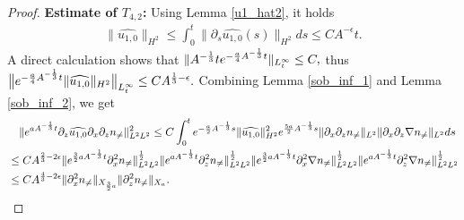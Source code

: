 \documentclass[12pt, reqno]{amsart}
\numberwithin{equation}{section}
\begin{document}
\begin{proof}
		\noindent\textbf{Estimate of $T_{4,2}$:}
		Using Lemma \ref{u1_hat2},  it holds
		\begin{equation*}
			\begin{aligned}
				\|\widehat{u_{1,0}}\|_{H^2}\leq \int_0^t \|\partial_s\widehat{u_{1,0}}(s)\|_{H^2}ds
				\leq CA^{-\epsilon}t.
			\end{aligned}
		\end{equation*}
		A direct calculation shows that $\|A^{-\frac13}t{\rm e}^{-\frac{a}{4}A^{-\frac13}t}\|_{L^{\infty}_t}\leq C,$
		thus
		$\big\|{\rm e}^{-\frac{a}{4}A^{-\frac13}t}\|\widehat{u_{1,0}}\|_{H^2}\big\|_{L^{\infty}_t} \leq CA^{\frac13-\epsilon}.$
		Combining Lemma \ref{sob_inf_1} and Lemma \ref{sob_inf_2}, we get
		\begin{equation}\label{temp1_2}
			\begin{aligned}
				&\quad\|{\rm e}^{aA^{-\frac{1}{3}}t}
				\partial_z\widehat{u_{1,0}}\partial_x\partial_z 	n_{\neq}\|_{L^2L^2}^2
				\leq C\int_0^t{\rm 	e}^{-\frac{a}{2}A^{-\frac13}s}\|\widehat{u_{1,0}}\|^2_{H^2}
				{\rm e}^{\frac{5a}{2}A^{-\frac13}s}
				\|\partial_x\partial_z n_{\neq}\|_{L^2}
				\|\partial_x\partial_z \nabla n_{\neq}\|_{L^2}ds\\
				&\leq CA^{\frac23-2\epsilon}
				\|{\rm 	e}^{\frac{3}{2}aA^{-\frac{1}{3}}t}
				\partial_x^2n_{\neq}\|_{L^2L^2}^{\frac12}
				\|{\rm 	e}^{aA^{-\frac{1}{3}}t}
				\partial_z^2n_{\neq}\|_{L^2L^2}^{\frac12}
				\|{\rm e}^{\frac{3}{2}aA^{-\frac{1}{3}}t}\partial_x^2\nabla n_{\neq}\|^{\frac12}_{L^2L^2}
				\|{\rm e}^{aA^{-\frac{1}{3}}t}\partial_z^2\nabla 	n_{\neq}\|^{\frac12}_{L^2L^2}\\
				&\leq CA^{\frac{4}{3}-2\epsilon}
				\|\partial_x^2n_{\neq}\|_{X_{\frac32a}}
				\|\partial_z^2n_{\neq}\|_{X_{a}}.
			\end{aligned}
		\end{equation}
		

\end{proof}
\end{document}
